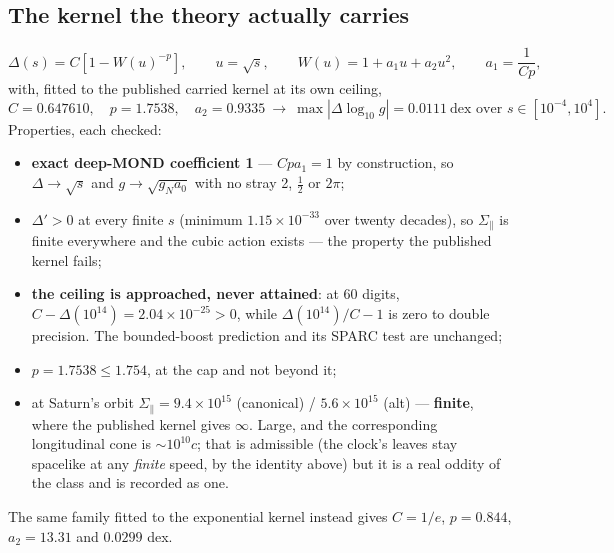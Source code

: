 \documentclass[11pt,letterpaper]{article}
\begin{document}
\subsection{The kernel the theory actually carries}
\begin{equation}
\Delta(s)=C\left[1-W(u)^{-p}\right],\qquad u=\sqrt s,\qquad W(u)=1+a_1u+a_2u^2,\qquad a_1=\frac{1}{Cp},
\end{equation}
with, fitted to the published carried kernel at its own ceiling,
\begin{equation}
C=0.647610,\quad p=1.7538,\quad a_2=0.9335\ \longrightarrow\ \max|\Delta\log_{10}g|=0.0111\ \text{dex over }s\in[10^{-4},10^{4}].
\end{equation}
Properties, each checked:
\begin{itemize}
\item \textbf{exact deep-MOND coefficient 1} --- $Cpa_1=1$ by construction, so $\Delta\to\sqrt s$ and $g\to\sqrt{g_Na_0}$ with no stray 2, $\tfrac12$ or $2\pi$;
\item $\Delta'>0$ at every finite $s$ (minimum $1.15\times10^{-33}$ over twenty decades), so $\Sigma_\parallel$ is finite everywhere and the cubic action exists --- the property the published kernel fails;
\item \textbf{the ceiling is approached, never attained}: at 60 digits, $C-\Delta(10^{14})=2.04\times10^{-25}>0$, while $\Delta(10^{14})/C-1$ is zero to double precision. The bounded-boost prediction and its SPARC test are unchanged;
\item $p=1.7538\le1.754$, at the cap and not beyond it;
\item at Saturn's orbit $\Sigma_\parallel=9.4\times10^{15}$ (canonical) / $5.6\times10^{15}$ (alt) --- \textbf{finite}, where the published kernel gives $\infty$. Large, and the corresponding longitudinal cone is ${\sim}10^{10}c$; that is admissible (the clock's leaves stay spacelike at any \emph{finite} speed, by the identity above) but it is a real oddity of the class and is recorded as one.
\end{itemize}
The same family fitted to the exponential kernel instead gives $C=1/e$, $p=0.844$, $a_2=13.31$ and $0.0299$ dex.
\end{document}
